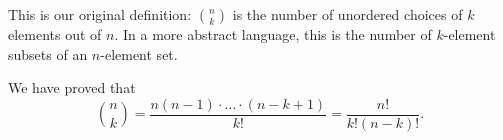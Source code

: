 

\setcounter{section}{3}
\setcounter{subsection}{1}
\setcounter{dfn}{0}

This is our original definition: $\binom{n}{k}$ is the number of unordered choices of $k$ elements out of $n$.
In a more abstract language, this is the number of $k$-element subsets of an $n$-element set.

We have proved that
\begin{equation}
\label{eqn:NChooseK}
\binom{n}{k} = \frac{n(n-1)\cdot \ldots \cdot (n-k+1)}{k!} = \frac{n!}{k!(n-k)!}.
\end{equation}




